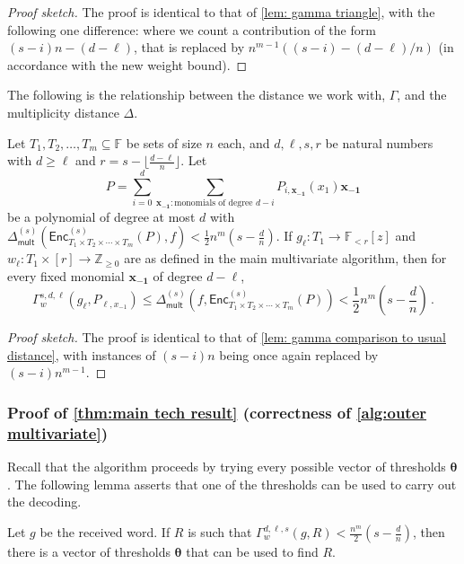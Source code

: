 \documentclass{theoretics}
\def\Integer{\mathbb{Z}}
\def\Field{\mathbb{F}}
\let\Z\Integer
\let\F\Field
\newcommand{\enc}{{\mathsf{Enc}}}
\newcommand{\Delm}{\Delta_{\mathsf{mult}}}
\newcommand{\thetabar}{{\boldsymbol{\theta}}}
\begin{document}
	\begin{proof}[Proof sketch]
		The proof is identical to that of \cref{lem: gamma triangle}, with the following one difference: where we count a contribution of the form $(s-i)n - (d-\ell)$, that is replaced by $n^{m-1} ((s-i)-(d-\ell)/n)$ (in accordance with the new weight bound). 
	\end{proof}
	
	The following is the relationship between the distance we work with, $\Gamma$, and the multiplicity distance $\Delta$. 
	
	\begin{lemma}
		Let $T_1, T_2, \dotsc, T_m \subseteq \F$ be sets of size $n$ each, and $d, \ell, s, r$ be natural numbers with $d \geq \ell$ and $r = s - \lfloor \frac{d-\ell}{n} \rfloor$. Let 
		\[P = \sum_{i = 0}^d \sum_{\mathbf{x_{-1}} \colon \text{monomials of degree } d-i} P_{i, \mathbf{x_{-1}}}(x_1) \mathbf{x_{-1}} \] 
		be a polynomial of degree at most $d$ with $\Delm^{(s)}(\enc^{(s)}_{T_1\times T_2 \times \dotsb \times T_m}(P), f) < \frac{1}{2} n^m (s-\frac{d}{n})$. If $g_{\ell}\colon  T_1 \to \F_{<r}[z]$ and $w_{\ell}\colon  T_1 \times [r] \to \Z_{\geq 0}$ are  as defined in the main multivariate algorithm, then for every fixed monomial $\mathbf{x_{-1}}$ of degree $d-\ell$,
		\[
		\Gamma_{w}^{s, d, \ell}(g_{\ell}, P_{\ell, x_{-1}}) \leq \Delm^{(s)}(f, \enc^{(s)}_{T_1\times T_2 \times \dotsb \times T_m }(P)) < \frac{1}{2}n^m\left(s - \frac{d}{n}\right) \, .
		\]
	\end{lemma}
	
	\begin{proof}[Proof sketch]
		The proof is identical to that of \cref{lem: gamma comparison to usual distance}, with instances of $(s-i)n$ being once again replaced by $(s-i)n^{m-1}$. 
	\end{proof}
	
	\subsubsection{Proof of \texorpdfstring{\cref{thm:main tech result}}{Theorem 3.9} (correctness of \texorpdfstring{\cref{alg:outer multivariate}}{Algorithm 4})}
	
	Recall that the algorithm proceeds by trying every possible vector of thresholds $\thetabar$. The following lemma asserts that one of the thresholds can be used to carry out the decoding.
	
	\begin{lemma}
		Let $g$ be the received word. If $R$ is such that $\Gamma_w^{d, \ell, s}(g, R) < \frac{n^m}{2}(s-\frac{d}{n})$, then there is a vector of thresholds $\thetabar$ that can be used to find $R$.
	\end{lemma}
	
\end{document}
